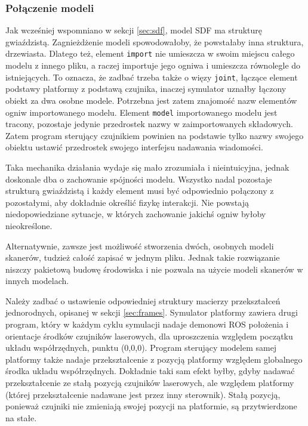 		\subsubsection{Połączenie modeli}
			Jak wcześniej wspomniano w sekcji \ref{sec:sdf},
			model SDF ma strukturę gwiaździstą. 
			Zagnieżdżenie modeli spowodowałoby, że powstałaby inna struktura, drzewiasta.
			Dlatego też, element \texttt{import} nie umieszcza w swoim miejscu całego modelu z innego pliku, a raczej importuje jego ogniwa i umieszcza równolegle do istniejących.
			To oznacza, że zadbać trzeba także o więzy \texttt{joint}, łączące element podstawy platformy z podstawą czujnika, inaczej symulator uznałby łączony obiekt za dwa osobne modele.
			Potrzebna jest zatem znajomość nazw elementów ogniw importowanego modelu.
			Element \texttt{model} importowanego modelu jest tracony, pozostaje jedynie przedrostek nazwy w zaimportowanych składowych.
			Zatem program sterujący czujnikiem powinien na podstawie tylko nazwy swojego obiektu ustawić przedrostek swojego interfejsu nadawania wiadomości.

			Taka mechanika działania wydaje się mało zrozumiała i nieintuicyjna, jednak doskonale dba o zachowanie spójności modelu.
			Wszystko nadal pozostaje strukturą gwiaździstą i każdy element musi być odpowiednio połączony z pozostałymi, aby dokładnie określić fizykę interakcji.
			Nie powstają niedopowiedziane sytuacje, w których zachowanie jakichś ogniw byłoby nieokreślone.

			Alternatywnie, zawsze jest możliwość stworzenia dwóch, osobnych modeli skanerów, tudzież całość zapisać w jednym pliku.
			Jednak takie rozwiązanie niszczy pakietową budowę środowiska i nie pozwala na użycie modeli skanerów w innych modelach.
			
			Należy zadbać o ustawienie odpowiedniej struktury macierzy przekształceń jednorodnych, opisanej w sekcji \ref{sec:frames}.
			Symulator platformy zawiera drugi program, który w każdym cyklu symulacji nadaje demonowi ROS położenia i orientacje środków czujników laserowych, dla uproszczenia
			względem początku układu współrzędnych, punktu (0,0,0). 
			Program sterujący modelem samej platformy także nadaje przekształcenie z pozycją platformy względem globalnego środka układu współrzędnych.
			Dokładnie taki sam efekt byłby, gdyby nadawać przekształcenie ze stałą pozycją czujników laserowych, ale względem platformy (której przekształcenie nadawane jest przez inny sterownik).
			Stałą pozycją, ponieważ czujniki nie zmieniają swojej pozycji na platformie, są przytwierdzone na stałe.

